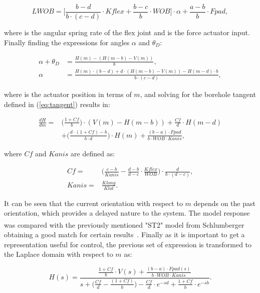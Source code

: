 \begin{equation}
	LWOB = \bigg[ \frac{b-d}{b \cdot (c-d)} \cdot Kflex + \frac{b-c}{b} \cdot WOB\bigg] \cdot \alpha + \frac{a-b}{b} \cdot Fpad,
\end{equation}

where  is the angular spring rate of the flex joint and  is the force actuator input. Finally finding the expressions for angles $\alpha$ and $\theta_D$:

\begin{align}
\alpha + \theta_D &= \frac{H(m) - (H(m-b) - V(m))}{b}, \\
\alpha &= \frac{H(m) \cdot (b - d) + d \cdot (H(m - b) - V(m)) - H(m-d) \cdot b}{b \cdot (c-d)},
\end{align}

where  is the actuator position in terms of $m$, and solving for the borehole tangent defined in (\ref{eq:tangent}) results in:

\begin{align}\label{eq:DowntonModelt}
		\frac{dH}{dm} =& \bigg( \frac{1+Cf}{b}\bigg) \cdot (V(m) - H(m-b)) + \frac{Cf}{d} \cdot H(m-d) \nonumber \\
		 &+ \bigg( \frac{d \cdot (1+Cf) - b}{b \cdot d}\bigg) \cdot H(m) + \frac{(b-a) \cdot Fpad}{b \cdot WOB \cdot Kanis},
\end{align}

where $Cf$ and $Kanis$ are defined as:

\begin{align*}
	Cf =& \bigg(\frac{c-b}{Kanis} - \frac{d-b}{d-c} \cdot \frac{Kflex}{WOB}\bigg) \cdot \frac{d}{b \cdot (d-c)}, \\
	Kanis  =& \frac{Klong}{Klat}.
\end{align*}

It can be seen that the current orientation with respect to $m$ depends on the past orientation, which provides a delayed nature to the system. The model response was compared with the previously mentioned "ST2" model from Schlumberger\textsuperscript{\textregistered} obtaining a good match for certain results~\cite{Down07}. Finally as it is important to get a representation useful for control, the previous set of expression is transformed to the Laplace domain with respect to $m$ as:

\begin{equation}\label{eq:DowntonModel}
	H(s) = \frac{\frac{1+Cf}{b} \cdot V(s) + \frac{(b-a) \cdot Fpad(s)}{b \cdot WOB \cdot Kanis}}{s + \bigg(\frac{Cf}{d} - \frac{(1+Cf)}{b}\bigg) - \frac{Cf}{d} \cdot e^{-sd} + \frac{1+Cf}{b} \cdot e^{-sb}}.
\end{equation}

